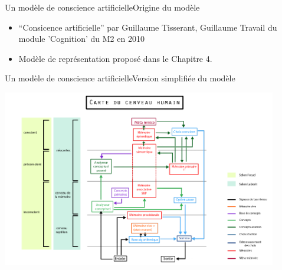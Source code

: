 \begin{frame}{Un modèle de conscience artificielle}{Origine du modèle}
\begin{itemize}
  \item ``Consicence
  artificielle'' par Guillaume Tisserant, Guillaume Travail du module
  'Cognition' du M2 en 2010
  \item Modèle de représentation proposé dans le Chapitre 4.
\end{itemize}
\end{frame}

\begin{frame}{Un modèle de conscience artificielle}{Version simplifiée du
modèle}
\begin{center}
\includegraphics[width=0.9\textwidth]{img/intro/modele_original}
\end{center}
\end{frame}

